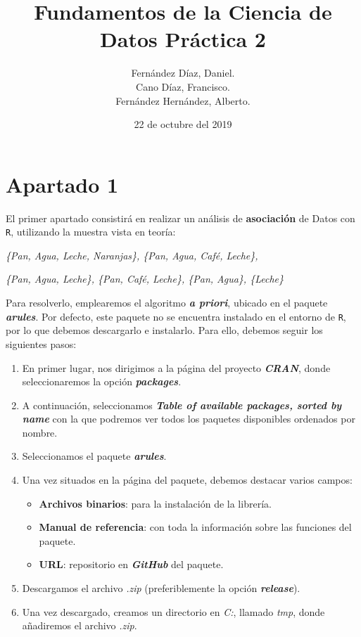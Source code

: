 \documentclass [a4paper] {article}
\title{\textbf{Fundamentos de la Ciencia de Datos Práctica 2}}
\author{
	Fernández Díaz, Daniel.\\
	Cano Díaz, Francisco.\\
	Fernández Hernández, Alberto.\\
}
\date{22 de octubre del 2019}
\begin{document}
\maketitle

\section{Apartado 1}

El primer apartado consistirá en realizar un análisis de \textbf{asociación} de Datos con \texttt{R}, utilizando la muestra vista en teoría:
\newline

\hfil \textit{\{Pan, Agua, Leche, Naranjas\}, \{Pan, Agua, Café, Leche\},} \par
\hfil \textit{\{Pan, Agua, Leche\}, \{Pan, Café, Leche\}, \{Pan, Agua\}, \{Leche\}} \par \leavevmode

Para resolverlo, emplearemos el algoritmo \textbf{\textit{a priori}}, ubicado en el paquete \textbf{\textit{arules}}. Por defecto, este paquete no se encuentra instalado 
en el entorno de \texttt{R}, por lo que debemos descargarlo e instalarlo. Para ello, debemos seguir los siguientes pasos:
\begin{enumerate}
    \item En primer lugar, nos dirigimos a la página del proyecto \textbf{\textit{CRAN}}, donde seleccionaremos la opción \textbf{\textit{packages}}.
    \item A continuación, seleccionamos \textbf{\textit{Table of available packages, sorted by name}} con la que podremos ver todos los paquetes disponibles ordenados por nombre.
    \item Seleccionamos el paquete \textbf{\textit{arules}}.
    \item Una vez situados en la página del paquete, debemos destacar varios campos:
        \begin{itemize}
            \item \textbf{Archivos binarios}: para la instalación de la librería.
            \item \textbf{Manual de referencia}: con toda la información sobre las funciones del paquete.
            \item \textbf{URL}: repositorio en \textbf{\textit{GitHub}} del paquete.
        \end{itemize}
    \item Descargamos el archivo \textit{.zip} (preferiblemente la opción \textbf{\textit{release}}).
    \item Una vez descargado, creamos un directorio en \textit{C:}, llamado \textit{tmp}, donde añadiremos el archivo \textit{.zip}.
\end{enumerate}
\end{document}
